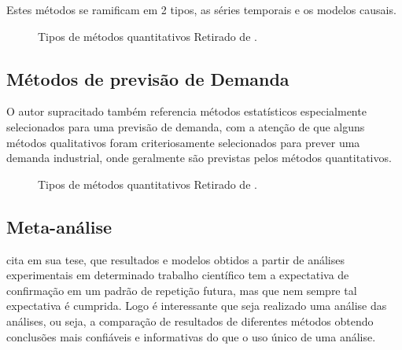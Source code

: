 \documentclass[	12pt, Times, openright, twoside, a4paper, english, brazil]{abntex2}
\begin{document}
Estes métodos se ramificam em 2 tipos, as séries temporais e os modelos causais.
\begin{figure}[!ht]
	\caption{Tipos de métodos quantitativos Retirado de \cite{Junior2007}.\label{fig:metodosQuantitativos}}
\end{figure}

\subsection{Métodos de previsão de Demanda}
O autor supracitado também referencia métodos estatísticos especialmente selecionados para uma previsão de demanda, com a atenção de que alguns métodos qualitativos foram criteriosamente selecionados para prever uma demanda industrial, onde geralmente são previstas pelos métodos quantitativos.

\begin{figure}[!ht]
	\caption{Tipos de métodos quantitativos Retirado de \cite{Junior2007}.\label{fig:metodosPrevisaoDemanda}}
\end{figure}


\subsection{Meta-análise}
\cite{Flavia2014} cita em sua tese, que resultados e modelos obtidos a partir de análises experimentais em determinado trabalho científico tem a expectativa de confirmação em um padrão de repetição futura, mas que nem sempre tal expectativa é cumprida. Logo é interessante que seja realizado uma análise das análises, ou seja, a comparação de resultados de diferentes métodos obtendo conclusões mais confiáveis e informativas do que o uso único de uma análise.
\end{document}
